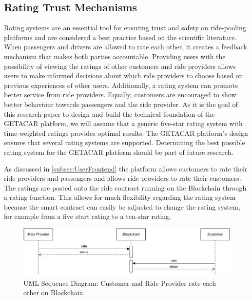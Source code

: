 \subsection{Rating Trust Mechanisms}\label{subsec:RatingTrustMechanisms}
Rating systems are an essential tool for ensuring trust and safety on ride-pooling platforms and are considered a best practice based on the scientific literature. When passengers and drivers are allowed to rate each other, it creates a feedback mechanism that makes both parties accountable. Providing users with the possibility of viewing the ratings of other customers and ride providers allows users to make informed decisions about which ride providers to choose based on previous experiences of other users. Additionally, a rating system can promote better service from ride providers. Equally, customers are encouraged to show better behaviour towards passengers and the ride provider. As it is the goal of this research paper to design and build the technical foundation of the GETACAR platform, we will assume that a generic five-star rating system with time-weighted ratings provides optimal results. The GETACAR platform's design ensures that several rating systems are supported. Determining the best possible rating system for the GETACAR platform should be part of future research. 

As discussed in \ref{subsec:UserFrontend} the platform allows customers to rate their ride providers and passengers and allows ride providers to rate their customers. The ratings are posted onto the ride contract running on the Blockchain through a rating function. This allows for much flexibility regarding the rating system because the smart contract can easily be adjusted to change the rating system, for example from a five start rating to a ten-star rating. 

\begin{figure}[h]
    \centering
    \includegraphics[width=\linewidth]{data/6.svg}
    \caption{UML Sequence Diagram: Customer and Ride Provider rate each other on Blockchain}
    \label{fig:directSVG}
\end{figure}



